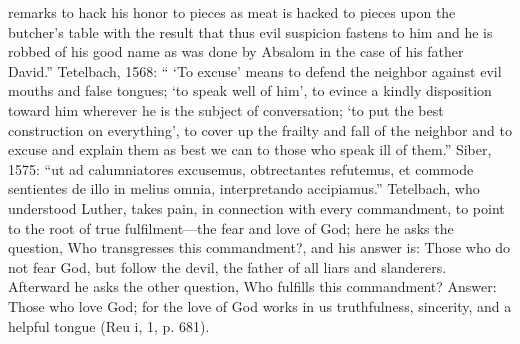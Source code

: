 remarks to hack his honor to pieces as meat is hacked to pieces upon the butcher’s table with the result that thus evil suspicion fastens to him and he is robbed of his good name as was done by Absalom in the case of his father David.” Tetelbach, 1568: “ ‘To excuse’ means to defend the neighbor against evil mouths and false tongues; ‘to speak well
of him’, to evince a kindly disposition toward him wherever he is the subject of conversation; ‘to put the best construction on everything’, to cover up the frailty and fall of the neighbor and to excuse and explain them as best we can to those who speak ill of them.” Siber, 1575: “ut ad calumniatores excusemus, obtrectantes refutemus, et commode sentientes de illo in melius omnia, interpretando accipiamus.” Tetelbach, who understood Luther, takes pain, in connection with every commandment, to point to the root of true fulfilment—the fear and love of God; here he asks the question, Who transgresses this commandment?, and his answer is: Those who do not fear God, but follow the devil, the father of all liars and slanderers. Afterward he asks the other question, Who fulfills this commandment? Answer: Those who love God; for the love of God works in us truthfulness, sincerity, and a helpful tongue (Reu i, 1, p. 681).

